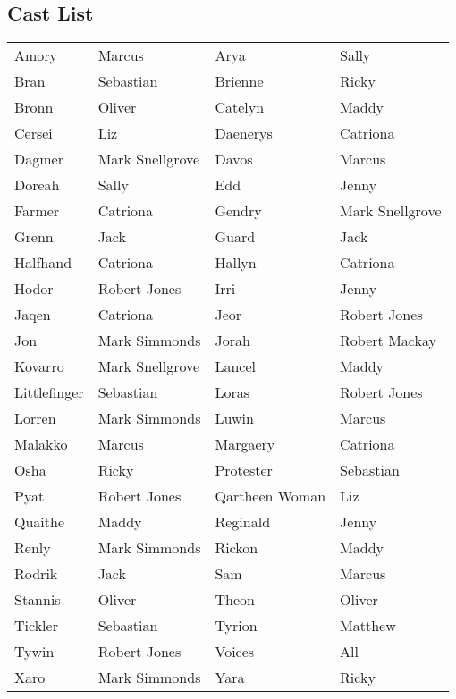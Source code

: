 \subsection*{Cast List}
\begin{tabular}{ll|ll}\\
Amory & Marcus &  Arya & Sally\\
Bran & Sebastian &  Brienne & Ricky\\
Bronn & Oliver &  Catelyn & Maddy\\
Cersei & Liz &  Daenerys & Catriona\\
Dagmer & Mark Snellgrove &  Davos & Marcus\\
Doreah & Sally &  Edd & Jenny\\
Farmer & Catriona &  Gendry & Mark Snellgrove\\
Grenn & Jack &  Guard & Jack\\
Halfhand & Catriona &  Hallyn & Catriona\\
Hodor & Robert Jones &  Irri & Jenny\\
Jaqen & Catriona &  Jeor & Robert Jones\\
Jon & Mark Simmonds &  Jorah & Robert Mackay\\
Kovarro & Mark Snellgrove &  Lancel & Maddy\\
Littlefinger & Sebastian &  Loras & Robert Jones\\
Lorren & Mark Simmonds &  Luwin & Marcus\\
Malakko & Marcus &  Margaery & Catriona\\
Osha & Ricky &  Protester & Sebastian\\
Pyat & Robert Jones &  Qartheen Woman & Liz\\
Quaithe & Maddy &  Reginald & Jenny\\
Renly & Mark Simmonds &  Rickon & Maddy\\
Rodrik & Jack &  Sam & Marcus\\
Stannis & Oliver &  Theon & Oliver\\
Tickler & Sebastian &  Tyrion & Matthew\\
Tywin & Robert Jones &  Voices & All\\
Xaro & Mark Simmonds &  Yara & Ricky\\
\end{tabular}
